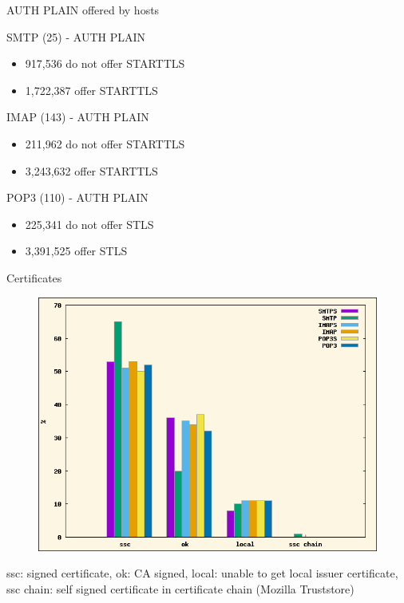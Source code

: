 \begin{frame}{AUTH PLAIN offered by hosts}

\begin{block}{SMTP (25) - AUTH PLAIN}

\begin{itemize}
\itemsep1pt\parskip0pt
\item
  917,536 do not offer STARTTLS
\item
  1,722,387 offer STARTTLS
\end{itemize}

\end{block}

\begin{block}{IMAP (143) - AUTH PLAIN}

\begin{itemize}
\itemsep1pt\parskip0pt
\item
  211,962 do not offer STARTTLS
\item
  3,243,632 offer STARTTLS
\end{itemize}

\end{block}

\begin{block}{POP3 (110) - AUTH PLAIN}

\begin{itemize}
\itemsep1pt\parskip0pt
\item
  225,341 do not offer STLS
\item
  3,391,525 offer STLS
\end{itemize}

\end{block}

\end{frame}

\begin{frame}{Certificates}

\begin{figure}[h!]
\centering
  \includegraphics[scale=0.40]{pki}
\end{figure}

ssc: signed certificate, ok: CA signed, local: unable to get local
issuer certificate, ssc chain: self signed certificate in certificate
chain (Mozilla Truststore)

\end{frame}

